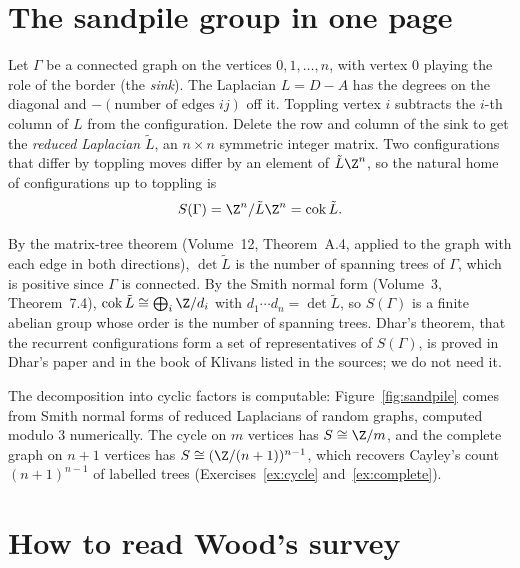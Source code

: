 \section{The sandpile group in one page}

Let $\Gamma$ be a connected graph on the vertices $0,1,\dots,n$, with vertex $0$ playing the role of the border (the \emph{sink}). The Laplacian $L=D-A$ has the degrees on the diagonal and $-(\text{number of edges }ij)$ off it. Toppling vertex $i$ subtracts the $i$-th column of $L$ from the configuration. Delete the row and column of the sink to get the \emph{reduced Laplacian} $\tilde L$, an $n\times n$ symmetric integer matrix. Two configurations that differ by toppling moves differ by an element of $\tilde L\Z^n$, so the natural home of configurations up to toppling is
\[
S(\Gamma)=\Z^n/\tilde L\Z^n=\operatorname{cok}\tilde L.
\]

\begin{remark}\label{rem:sandpilefacts}
By the matrix-tree theorem (Volume~12, Theorem~A.4, applied to the graph with each edge in both directions), $\det\tilde L$ is the number of spanning trees of $\Gamma$, which is positive since $\Gamma$ is connected. By the Smith normal form (Volume~3, Theorem~7.4), $\operatorname{cok}\tilde L\cong\bigoplus_i\Z/d_i$ with $d_1\cdots d_n=\det\tilde L$, so $S(\Gamma)$ is a finite abelian group whose order is the number of spanning trees. Dhar's theorem, that the recurrent configurations form a set of representatives of $S(\Gamma)$, is proved in Dhar's paper and in the book of Klivans listed in the sources; we do not need it.
\end{remark}

The decomposition into cyclic factors is computable: Figure~\ref{fig:sandpile} comes from Smith normal forms of reduced Laplacians of random graphs, computed modulo $3$ numerically. The cycle on $m$ vertices has $S\cong\Z/m$, and the complete graph on $n+1$ vertices has $S\cong(\Z/(n+1))^{n-1}$, which recovers Cayley's count $(n+1)^{n-1}$ of labelled trees (Exercises~\ref{ex:cycle} and~\ref{ex:complete}).

\section{How to read Wood's survey}

